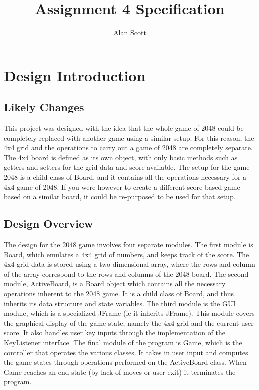 \documentclass[12pt]{article}
\title{Assignment 4 Specification}
\author{Alan Scott}
\begin{document}
\maketitle
\newpage

\section*{Design Introduction}
\subsection*{Likely Changes}
This project was designed with the idea that the whole game of 2048 could be completely replaced with another game using a similar setup. For this reason, the 4x4 grid and the operations to carry out a game of 2048 are completely separate. The 4x4 board is defined as its own object, with only basic methods such as getters and setters for the grid data and score available. The setup for the game 2048 is a child class of Board, and it contains all the operations necessary for a 4x4 game of 2048. If you were however to create a different score based game based on a similar board, it could be re-purposed to be used for that setup.
\subsection*{Design Overview}
The design for the 2048 game involves four separate modules. The first module is Board, which emulates a 4x4 grid of numbers, and keeps track of the score. The 4x4 grid data is stored using a two dimensional array, where the rows and column of the array correspond to the rows and columns of the 2048 board. The second module, ActiveBoard, is a Board object which contains all the necessary operations inherent to the 2048 game. It is a child class of Board, and thus inherits its data structure and state variables. The third module is the GUI module, which is a specialized JFrame (ie it inherits JFrame). This module covers the graphical display of the game state, namely the 4x4 grid and the current user score. It also handles user key inputs through the implementation of the KeyListener interface. The final module of the program is Game, which is the controller that operates the various classes. It takes in user input and computes the game states through operations performed on the ActiveBoard class. When Game reaches an end state (by lack of moves or user exit) it terminates the program. 

\newpage
\end{document}
